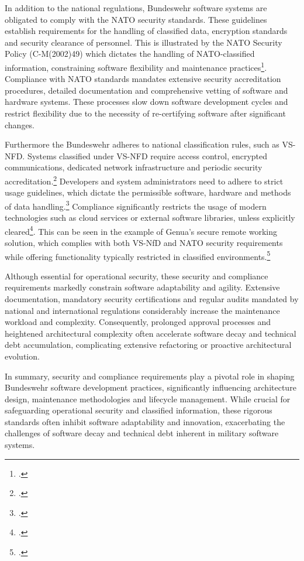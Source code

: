In addition to the national regulations, Bundeswehr software systems are obligated to comply with the NATO security standards. These guidelines establish requirements for the handling of classified data, encryption standards and security clearance of personnel.
This is illustrated by the NATO Security Policy (C-M(2002)49) which dictates the handling of NATO-classified information, constraining software flexibility and maintenance practices\footcite[Enclosure B, pp. 1–3; Enclosure F, pp. 1–2]{NATO2002SecurityPolicy}. 
Compliance with NATO standards mandates extensive security accreditation procedures, detailed documentation and comprehensive vetting of software and hardware systems.
These processes slow down software development cycles and restrict flexibility due to the necessity of re-certifying software after significant changes.

Furthermore the Bundeswehr adheres to national classification rules, such as \ac{VS-NFD}. Systems classified under \ac{VS-NFD} require access control, encrypted communications, dedicated network infrastructure and periodic security accreditation.\footcite[see Part 2, pp. 1–3; Part 3, pp. 1–6]{BMI2010VSNFD}
Developers and system administrators need to adhere to strict usage guidelines, which dictate the permissible software, hardware and methods of data handling.\footcite[Part 3, No. 3.1–3.7, pp. 1–5]{BMI2010VSNFD} Compliance significantly restricts the usage of modern technologies such as cloud services or external software libraries, unless explicitly cleared\footcite[Part 3, No. 3.4.1–3.4.5, pp. 4–5]{BMI2010VSNFD}. 
This can be seen in the example of Genua’s secure remote working solution, which complies with both VS-NfD and NATO security requirements while offering functionality typically restricted in classified environments.\footcite{Genua2023VSNFD}

Although essential for operational security, these security and compliance requirements markedly constrain software adaptability and agility. 
Extensive documentation, mandatory security certifications and regular audits mandated by national and international regulations considerably increase the maintenance workload and complexity. 
Consequently, prolonged approval processes and heightened architectural complexity often accelerate software decay and technical debt accumulation, complicating extensive refactoring or proactive architectural evolution.

In summary, security and compliance requirements play a pivotal role in shaping Bundeswehr software development practices, significantly influencing architecture design, 
maintenance methodologies and lifecycle management. While crucial for safeguarding operational security and classified information, these rigorous standards often inhibit software adaptability and innovation, exacerbating the challenges of software decay and technical debt inherent in military software systems.

